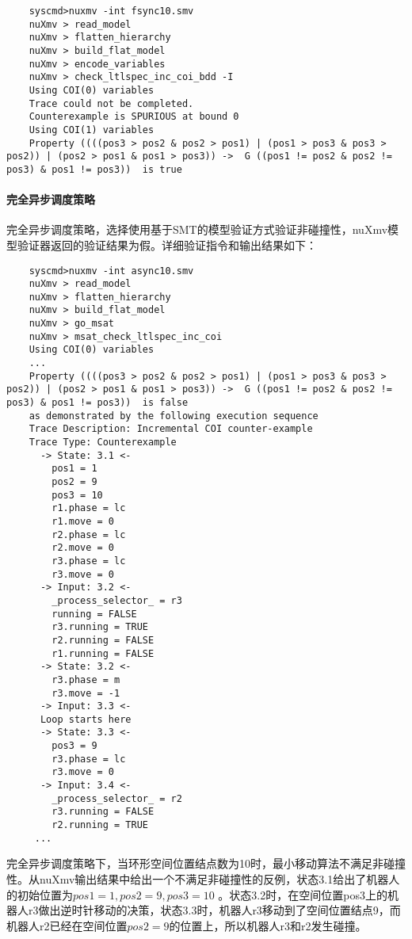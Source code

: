 \begin{lstlisting}
    syscmd>nuxmv -int fsync10.smv
    nuXmv > read_model
    nuXmv > flatten_hierarchy
    nuXmv > build_flat_model
    nuXmv > encode_variables
    nuXmv > check_ltlspec_inc_coi_bdd -I
    Using COI(0) variables
    Trace could not be completed.
    Counterexample is SPURIOUS at bound 0
    Using COI(1) variables
    Property ((((pos3 > pos2 & pos2 > pos1) | (pos1 > pos3 & pos3 > pos2)) | (pos2 > pos1 & pos1 > pos3)) ->  G ((pos1 != pos2 & pos2 != pos3) & pos1 != pos3))  is true
\end{lstlisting}

\paragraph{完全异步调度策略}
完全异步调度策略，选择使用基于SMT的模型验证方式验证非碰撞性，nuXmv模型验证器返回的验证结果为假。详细验证指令和输出结果如下：

\begin{lstlisting}
    syscmd>nuxmv -int async10.smv
    nuXmv > read_model
    nuXmv > flatten_hierarchy
    nuXmv > build_flat_model
    nuXmv > go_msat
    nuXmv > msat_check_ltlspec_inc_coi
    Using COI(0) variables
    ...
    Property ((((pos3 > pos2 & pos2 > pos1) | (pos1 > pos3 & pos3 > pos2)) | (pos2 > pos1 & pos1 > pos3)) ->  G ((pos1 != pos2 & pos2 != pos3) & pos1 != pos3))  is false
    as demonstrated by the following execution sequence
    Trace Description: Incremental COI counter-example
    Trace Type: Counterexample
      -> State: 3.1 <-
        pos1 = 1
        pos2 = 9
        pos3 = 10
        r1.phase = lc
        r1.move = 0
        r2.phase = lc
        r2.move = 0
        r3.phase = lc
        r3.move = 0
      -> Input: 3.2 <-
        _process_selector_ = r3
        running = FALSE
        r3.running = TRUE
        r2.running = FALSE
        r1.running = FALSE
      -> State: 3.2 <-
        r3.phase = m
        r3.move = -1
      -> Input: 3.3 <-
      Loop starts here
      -> State: 3.3 <-
        pos3 = 9
        r3.phase = lc
        r3.move = 0
      -> Input: 3.4 <-
        _process_selector_ = r2
        r3.running = FALSE
        r2.running = TRUE
     ...
\end{lstlisting}

完全异步调度策略下，当环形空间位置结点数为10时，最小移动算法不满足非碰撞性。从nuXmv输出结果中给出一个不满足非碰撞性的反例，状态3.1给出了机器人的初始位置为$pos1=1,pos2=9,pos3=10$ 。状态3.2时，在空间位置pos3上的机器人r3做出逆时针移动的决策，状态3.3时，机器人r3移动到了空间位置结点9，而机器人r2已经在空间位置$pos2=9$的位置上，所以机器人r3和r2发生碰撞。

